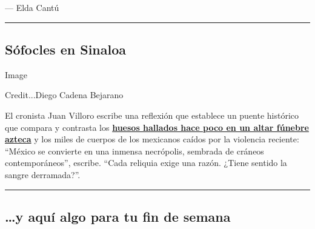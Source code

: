 --- Elda Cantú

\begin{center}\rule{0.5\linewidth}{\linethickness}\end{center}

\hypertarget{suxf3focles-en-sinaloa}{%
\subsection{Sófocles en Sinaloa}\label{suxf3focles-en-sinaloa}}

Image

Credit...Diego Cadena Bejarano

El cronista Juan Villoro escribe una reflexión que establece un puente
histórico que compara y contrasta los
\textbf{\href{https://www.nytimes.com/es/2020/07/30/espanol/opinion/aztecas-violencia-narco-amlo.html}{huesos
hallados hace poco en un altar fúnebre azteca}} y los miles de cuerpos
de los mexicanos caídos por la violencia reciente: ``México se convierte
en una inmensa necrópolis, sembrada de cráneos contemporáneos'',
escribe. ``Cada reliquia exige una razón. ¿Tiene sentido la sangre
derramada?''.

\begin{center}\rule{0.5\linewidth}{\linethickness}\end{center}

\hypertarget{y-aquuxed-algo-para-tu-fin-de-semana}{%
\subsection{\ldots{}y aquí algo para tu fin de
semana}\label{y-aquuxed-algo-para-tu-fin-de-semana}}


